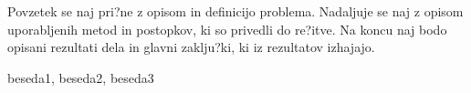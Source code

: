 \povzetek



Povzetek se naj pri?ne z opisom in definicijo problema. Nadaljuje se
naj z opisom uporabljenih metod in postopkov, ki so privedli do
re?itve. Na koncu naj bodo opisani rezultati dela in glavni zaklju?ki, ki iz rezultatov
izhajajo.


\kljucnebesede beseda1, beseda2, beseda3